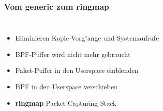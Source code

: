 \documentclass{beamer}
\begin{document}
\begin{frame}
\frametitle{Vom generic zum ringmap}
\begin{columns}
\vspace{-1em}
\begin{itemize}
	\item<2->Eliminieren Kopie-Vorg"ange und Systemaufrufe
	\item<3->BPF-Puffer wird nicht mehr gebraucht
	\item<4->Paket-Puffer in den Userspace einblenden
	\item<5->BPF in den Userspace verschieben
	\item<6->\textbf{ringmap}-Packet-Capturing-Stack
\end{itemize}
\vspace{-2em}

\end{columns}
\end{frame}
\end{document}
